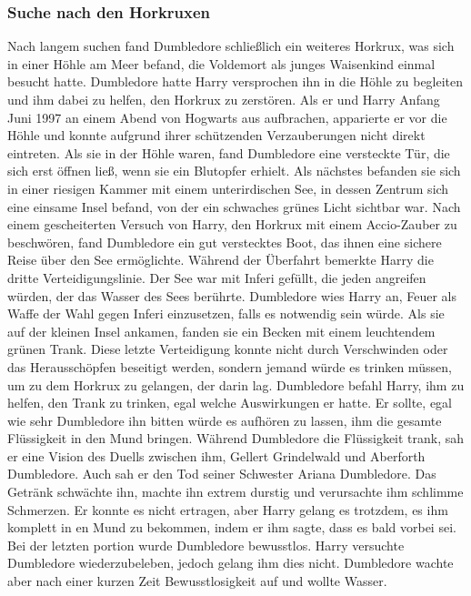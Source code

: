 \documentclass[a4paper, 10pt]{article}
\begin{document}
\subsubsection*{Suche nach den Horkruxen}
Nach langem suchen fand Dumbledore schließlich ein weiteres Horkrux, was sich in einer Höhle am Meer befand, die Voldemort als junges Waisenkind einmal besucht hatte. Dumbledore hatte Harry versprochen ihn in die Höhle zu begleiten und ihm dabei zu helfen, den Horkrux zu zerstören. Als er und Harry Anfang Juni 1997 an einem Abend von Hogwarts aus aufbrachen, apparierte er vor die Höhle und konnte aufgrund ihrer schützenden Verzauberungen nicht direkt eintreten. Als sie in der Höhle waren, fand Dumbledore eine versteckte Tür, die sich erst öffnen ließ, wenn sie ein Blutopfer erhielt.
\vspace{10pt}
\newline
{}  
Als nächstes befanden sie sich in einer riesigen Kammer mit einem unterirdischen See, in dessen Zentrum sich eine einsame Insel befand, von der ein schwaches grünes Licht sichtbar war. Nach einem gescheiterten Versuch von Harry, den Horkrux mit einem Accio-Zauber zu beschwören, fand Dumbledore ein gut verstecktes Boot, das ihnen eine sichere Reise über den See ermöglichte. Während der Überfahrt bemerkte Harry die dritte Verteidigungslinie. Der See war mit Inferi gefüllt, die jeden angreifen würden, der das Wasser des Sees berührte. Dumbledore wies Harry an, Feuer als Waffe der Wahl gegen Inferi einzusetzen, falls es notwendig sein würde.
\vspace{10pt}
\newline
{}  
Als sie auf der kleinen Insel ankamen, fanden sie ein Becken mit einem leuchtendem grünen Trank. Diese letzte Verteidigung konnte nicht durch Verschwinden oder das Herausschöpfen beseitigt werden, sondern jemand würde es trinken müssen, um zu dem Horkrux zu gelangen, der darin lag. Dumbledore befahl Harry, ihm zu helfen, den Trank zu trinken, egal welche Auswirkungen er hatte. Er sollte, egal wie sehr Dumbledore ihn bitten würde es aufhören zu lassen, ihm die gesamte Flüssigkeit in den Mund bringen.
\vspace{10pt}
\newline
{}  
Während Dumbledore die Flüssigkeit trank, sah er eine Vision des Duells zwischen ihm, Gellert Grindelwald und Aberforth Dumbledore. Auch sah er den Tod seiner Schwester Ariana Dumbledore. Das Getränk schwächte ihn, machte ihn extrem durstig und verursachte ihm schlimme Schmerzen. Er konnte es nicht ertragen, aber Harry gelang es trotzdem, es ihm komplett in en Mund zu bekommen, indem er ihm sagte, dass es bald vorbei sei. Bei der letzten portion wurde Dumbledore bewusstlos. Harry versuchte Dumbledore wiederzubeleben, jedoch gelang ihm dies nicht. Dumbledore wachte aber nach einer kurzen Zeit Bewusstlosigkeit auf und wollte Wasser.
\end{document}
